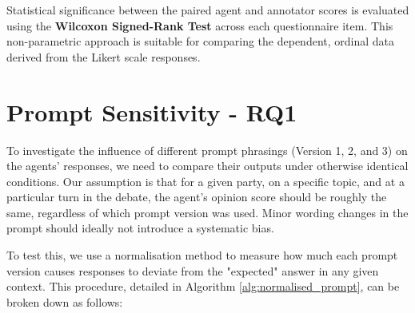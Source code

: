 Statistical significance between the paired agent and annotator scores is evaluated using the \textbf{Wilcoxon Signed-Rank Test} across each questionnaire item. This non-parametric approach is suitable for comparing the dependent, ordinal data derived from the Likert scale responses.



\section{Prompt Sensitivity - RQ1}

To investigate the influence of different prompt phrasings (Version 1, 2, and 3) on the agents' responses, we need to compare their outputs under otherwise identical conditions. Our assumption is that for a given party, on a specific topic, and at a particular turn in the debate, the agent's opinion score should be roughly the same, regardless of which prompt version was used. Minor wording changes in the prompt should ideally not introduce a systematic bias.

To test this, we use a normalisation method to measure how much each prompt version causes responses to deviate from the "expected" answer in any given context. This procedure, detailed in Algorithm \ref{alg:normalised_prompt}, can be broken down as follows:


